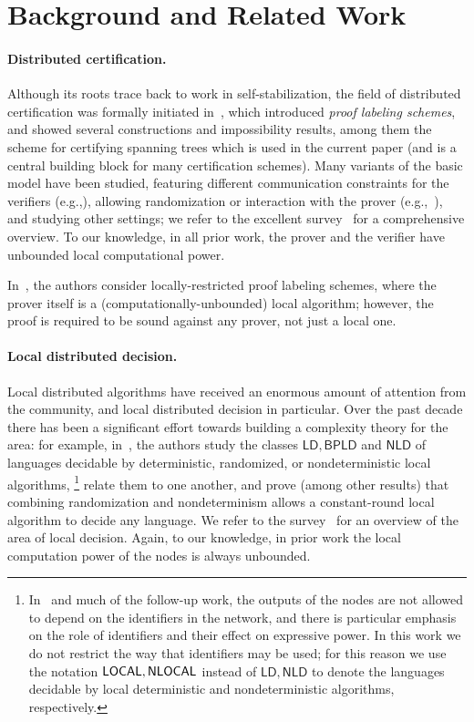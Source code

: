 \section{Background and Related Work}
\label{sec:related}

\paragraph{Distributed certification.}
Although its roots trace back to work in self-stabilization,
the field of distributed certification was formally initiated in~\cite{korman2005proof},
which introduced \emph{proof labeling schemes}, and showed several constructions and impossibility results,
among them the scheme for certifying spanning trees which is used in the current paper (and is
a central building block for many certification schemes).
Many variants of the basic model have been studied, featuring different communication constraints
for the verifiers (e.g.,\cite{ostrovsky2017space,patt2017proof,FFHPP21}),
allowing randomization or interaction with the prover (e.g.,~\cite{baruch2015randomized,KOS18,NPY20}),
and studying other settings;
we refer to the excellent survey~\cite{CertSurvey} for a comprehensive overview.
To our knowledge, in all prior work, the prover and the verifier have unbounded local computational power.

In~\cite{EGK22}, the authors consider {locally-restricted proof labeling schemes},
where the prover itself is a (computationally-unbounded) local algorithm;
however, the proof is required to be sound against any prover, not just a local one.

\paragraph{Local distributed decision.}
Local distributed algorithms have received an enormous amount of attention from the community,
and local distributed decision in particular.
Over the past decade there has been a significant effort towards building
a complexity theory for the area: for example, in~\cite{fraigniaud2013towards},
the authors study the classes $\mathsf{LD}, \mathsf{BPLD}$ and $\mathsf{NLD}$ of languages decidable
by deterministic, randomized, or nondeterministic local algorithms,%
\footnote{In~\cite{fraigniaud2013towards} and much of the follow-up work, the outputs
of the nodes are not allowed to depend on the identifiers in the network,
and there is particular emphasis on the role of identifiers
and their effect on expressive power.
In this work we do not restrict the way that identifiers may be used;
for this reason we use the notation ${\mathsf{LOCAL}}, {\mathsf{NLOCAL}}$
instead of $\mathsf{LD}, \mathsf{NLD}$ to denote
the languages decidable by local deterministic and nondeterministic algorithms, respectively.}
relate them to one another, and prove (among other results) that combining randomization
and nondeterminism allows a constant-round local algorithm to decide any language.
We refer to the survey~\cite{LDSurvey} for an overview of the area of local decision.
Again, to our knowledge, in prior work the local computation power of the nodes is
always unbounded.